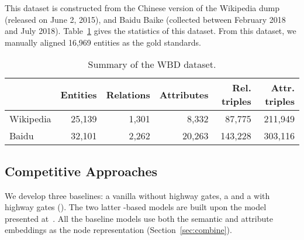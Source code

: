 	 This dataset is constructed from the Chinese version of the Wikipedia dump (released on June 2, 2015), and Baidu Baike (collected between February 2018 and July 2018).
    Table~\ref{dataset} gives the statistics of this dataset. From this dataset, we manually aligned 16,969 entities as the gold standards.

%	




	\begin{table}
	\centering
	\scriptsize
	\begin{tabular}{l|rrrrr}
		\toprule
		&\bf  Entities &\bf  Relations &\bf  Attributes &\bf  Rel. triples &\bf  Attr. triples \\
		\midrule
		Wikipedia & 25,139 & 1,301 & 8,332 & 87,775 & 211,949 \\
		Baidu & 32,101 & 2,262 & 20,263 & 143,228 & 303,116 \\
		\bottomrule
	\end{tabular}
	\caption{Summary of the WBD dataset.}
	\label{dataset}
\end{table}


	\subsection{Competitive Approaches}
	We develop three baselines: a vanilla \HRGCN without highway gates, a \GCN and a \GCN with highway gates (\HGCN). The two latter \GCN-based models are built upon the model presented at~\cite{Kipf2016Semi}.
    All the baseline models use both the semantic and attribute embeddings as the node representation (Section~\ref{sec:combine}).

